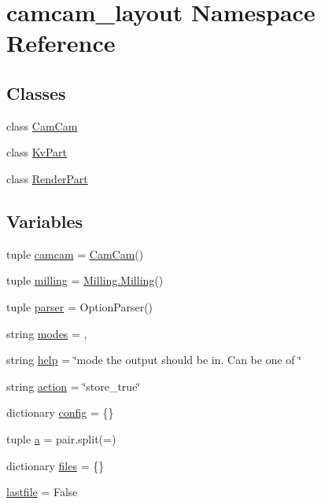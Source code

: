 \hypertarget{namespacecamcam__layout}{}\section{camcam\+\_\+layout Namespace Reference}
\label{namespacecamcam__layout}
\subsection*{Classes}
\begin{DoxyCompactItemize}
\item 
class \hyperlink{classcamcam__layout_1_1_cam_cam}{Cam\+Cam}
\item 
class \hyperlink{classcamcam__layout_1_1_kv_part}{Kv\+Part}
\item 
class \hyperlink{classcamcam__layout_1_1_render_part}{Render\+Part}
\end{DoxyCompactItemize}
\subsection*{Variables}
\begin{DoxyCompactItemize}
\item 
tuple \hyperlink{namespacecamcam__layout_ae87c88da350af649972459a28988ebb8}{camcam} = \hyperlink{classcamcam__layout_1_1_cam_cam}{Cam\+Cam}()
\item 
tuple \hyperlink{namespacecamcam__layout_aac26a995c03881acd11062893ac5daec}{milling} = \hyperlink{class_milling_1_1_milling}{Milling.\+Milling}()
\item 
tuple \hyperlink{namespacecamcam__layout_a81d184a591905f9b4ed2f6032fcab2ec}{parser} = Option\+Parser()
\item 
string \hyperlink{namespacecamcam__layout_a8dd26061aa3b54fe561f7ed0a9017030}{modes} = \textquotesingle{},\textquotesingle{}
\item 
string \hyperlink{namespacecamcam__layout_a0af636005ce49aadd41c5bc3ff4e8bae}{help} = \char`\"{}mode the output should be in. Can be one of \char`\"{}
\item 
string \hyperlink{namespacecamcam__layout_a71172dacf7602866e7e96b4252a15441}{action} = \char`\"{}store\+\_\+true\char`\"{}
\item 
dictionary \hyperlink{namespacecamcam__layout_a6cec7cab5f48675ec716f94c0a23836e}{config} = \{\}
\item 
tuple \hyperlink{namespacecamcam__layout_a4693b9fdabb3c2c214239fcba102f1ce}{a} = pair.\+split(\textquotesingle{}=\textquotesingle{})
\item 
dictionary \hyperlink{namespacecamcam__layout_ac7f3bbb8118ef7b6eea636a1316c0817}{files} = \{\}
\item 
\hyperlink{namespacecamcam__layout_a4d08c4feed053d3ab8a799dd7f3fcec4}{lastfile} = False
\end{DoxyCompactItemize}


